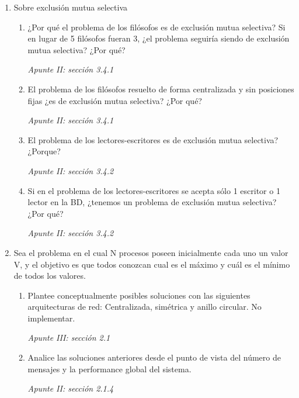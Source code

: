 \documentclass[a4paper, 10pt]{article}
\newenvironment{QandA}{
    \begin{enumerate}\bfseries}
    {\end{enumerate}
}
\newenvironment{answered}{\par\normalfont}{}
\begin{document}
\begin{QandA}

\item Sobre exclusión mutua selectiva

\begin{enumerate}[label=\alph*)]
\item ¿Por qué el problema de los filósofos es de exclusión mutua selectiva? Si en lugar de 5 filósofos fueran 3, ¿el problema seguiría siendo de exclusión mutua selectiva? ¿Por qué?
\begin{answered}
    \emph{Apunte II: sección 3.4.1}
\end{answered}
\item El problema de los filósofos resuelto de forma centralizada y sin posiciones fijas ¿es de exclusión mutua selectiva? ¿Por qué?
\begin{answered}
    \emph{Apunte II: sección 3.4.1}
\end{answered}
\item El problema de los lectores-escritores es de exclusión mutua selectiva? ¿Porque?
\begin{answered}
    \emph{Apunte II: sección 3.4.2}
\end{answered}
\item Si en el problema de los lectores-escritores se acepta sólo 1 escritor  o 1 lector en la BD, ¿tenemos un problema de exclusión mutua selectiva?  ¿Por qué?
\begin{answered}
    \emph{Apunte II: sección 3.4.2}
\end{answered}
\end{enumerate}


\item Sea el problema en el cual N procesos poseen inicialmente cada uno un valor V, y el objetivo es que todos conozcan cual es el máximo y cuál es el mínimo de todos los valores.

\begin{enumerate}[label=\alph*)]
\item Plantee conceptualmente posibles soluciones con las siguientes arquitecturas de red: Centralizada, simétrica y anillo circular. No implementar.
\begin{answered}
    \emph{Apunte III: sección 2.1}
\end{answered}
\item Analice las soluciones anteriores desde el punto de vista del número de mensajes y la performance global del sistema.
\begin{answered}
    \emph{Apunte II: sección 2.1.4}
\end{answered}
\end{enumerate}


\end{QandA}
\end{document}
